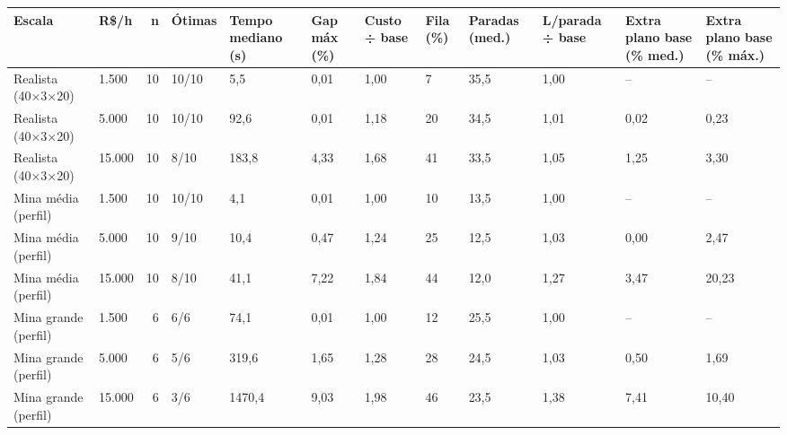 \begin{tabular}{llrlllllllll}
\toprule
Escala & R\$/h & n & Ótimas & Tempo mediano (s) & Gap máx (\%) & Custo ÷ base & Fila (\%) & Paradas (med.) & L/parada ÷ base & Extra plano base (\% med.) & Extra plano base (\% máx.) \\
\midrule
Realista (40×3×20) & 1.500 & 10 & 10/10 & 5,5 & 0,01 & 1,00 & 7 & 35,5 & 1,00 & – & – \\
Realista (40×3×20) & 5.000 & 10 & 10/10 & 92,6 & 0,01 & 1,18 & 20 & 34,5 & 1,01 & 0,02 & 0,23 \\
Realista (40×3×20) & 15.000 & 10 & 8/10 & 183,8 & 4,33 & 1,68 & 41 & 33,5 & 1,05 & 1,25 & 3,30 \\
Mina média (perfil) & 1.500 & 10 & 10/10 & 4,1 & 0,01 & 1,00 & 10 & 13,5 & 1,00 & – & – \\
Mina média (perfil) & 5.000 & 10 & 9/10 & 10,4 & 0,47 & 1,24 & 25 & 12,5 & 1,03 & 0,00 & 2,47 \\
Mina média (perfil) & 15.000 & 10 & 8/10 & 41,1 & 7,22 & 1,84 & 44 & 12,0 & 1,27 & 3,47 & 20,23 \\
Mina grande (perfil) & 1.500 & 6 & 6/6 & 74,1 & 0,01 & 1,00 & 12 & 25,5 & 1,00 & – & – \\
Mina grande (perfil) & 5.000 & 6 & 5/6 & 319,6 & 1,65 & 1,28 & 28 & 24,5 & 1,03 & 0,50 & 1,69 \\
Mina grande (perfil) & 15.000 & 6 & 3/6 & 1470,4 & 9,03 & 1,98 & 46 & 23,5 & 1,38 & 7,41 & 10,40 \\
\bottomrule
\end{tabular}
